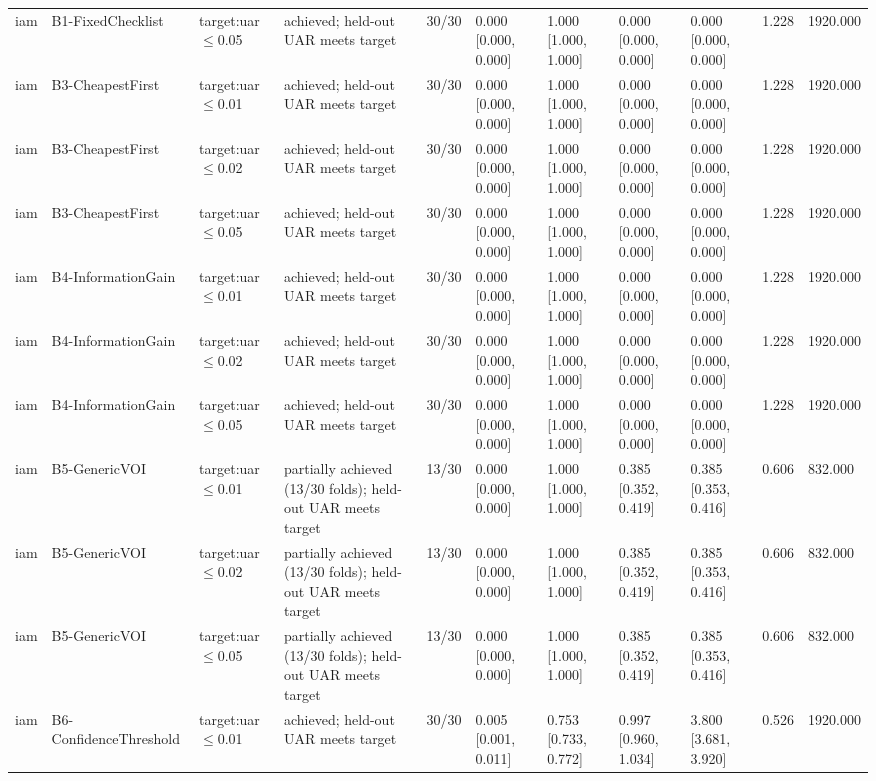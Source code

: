 \begin{table}[!ht]
{\begin{tabular}{lllllllllll}
iam & B1-FixedChecklist & target:uar$\le$0.05 & achieved; held-out UAR meets target & 30/30 & 0.000 [0.000, 0.000] & 1.000 [1.000, 1.000] & 0.000 [0.000, 0.000] & 0.000 [0.000, 0.000] & 1.228 & 1920.000 \\
iam & B3-CheapestFirst & target:uar$\le$0.01 & achieved; held-out UAR meets target & 30/30 & 0.000 [0.000, 0.000] & 1.000 [1.000, 1.000] & 0.000 [0.000, 0.000] & 0.000 [0.000, 0.000] & 1.228 & 1920.000 \\
iam & B3-CheapestFirst & target:uar$\le$0.02 & achieved; held-out UAR meets target & 30/30 & 0.000 [0.000, 0.000] & 1.000 [1.000, 1.000] & 0.000 [0.000, 0.000] & 0.000 [0.000, 0.000] & 1.228 & 1920.000 \\
iam & B3-CheapestFirst & target:uar$\le$0.05 & achieved; held-out UAR meets target & 30/30 & 0.000 [0.000, 0.000] & 1.000 [1.000, 1.000] & 0.000 [0.000, 0.000] & 0.000 [0.000, 0.000] & 1.228 & 1920.000 \\
iam & B4-InformationGain & target:uar$\le$0.01 & achieved; held-out UAR meets target & 30/30 & 0.000 [0.000, 0.000] & 1.000 [1.000, 1.000] & 0.000 [0.000, 0.000] & 0.000 [0.000, 0.000] & 1.228 & 1920.000 \\
iam & B4-InformationGain & target:uar$\le$0.02 & achieved; held-out UAR meets target & 30/30 & 0.000 [0.000, 0.000] & 1.000 [1.000, 1.000] & 0.000 [0.000, 0.000] & 0.000 [0.000, 0.000] & 1.228 & 1920.000 \\
iam & B4-InformationGain & target:uar$\le$0.05 & achieved; held-out UAR meets target & 30/30 & 0.000 [0.000, 0.000] & 1.000 [1.000, 1.000] & 0.000 [0.000, 0.000] & 0.000 [0.000, 0.000] & 1.228 & 1920.000 \\
iam & B5-GenericVOI & target:uar$\le$0.01 & partially achieved (13/30 folds); held-out UAR meets target & 13/30 & 0.000 [0.000, 0.000] & 1.000 [1.000, 1.000] & 0.385 [0.352, 0.419] & 0.385 [0.353, 0.416] & 0.606 & 832.000 \\
iam & B5-GenericVOI & target:uar$\le$0.02 & partially achieved (13/30 folds); held-out UAR meets target & 13/30 & 0.000 [0.000, 0.000] & 1.000 [1.000, 1.000] & 0.385 [0.352, 0.419] & 0.385 [0.353, 0.416] & 0.606 & 832.000 \\
iam & B5-GenericVOI & target:uar$\le$0.05 & partially achieved (13/30 folds); held-out UAR meets target & 13/30 & 0.000 [0.000, 0.000] & 1.000 [1.000, 1.000] & 0.385 [0.352, 0.419] & 0.385 [0.353, 0.416] & 0.606 & 832.000 \\
iam & B6-ConfidenceThreshold & target:uar$\le$0.01 & achieved; held-out UAR meets target & 30/30 & 0.005 [0.001, 0.011] & 0.753 [0.733, 0.772] & 0.997 [0.960, 1.034] & 3.800 [3.681, 3.920] & 0.526 & 1920.000 \\

\end{tabular}}
\end{table}
